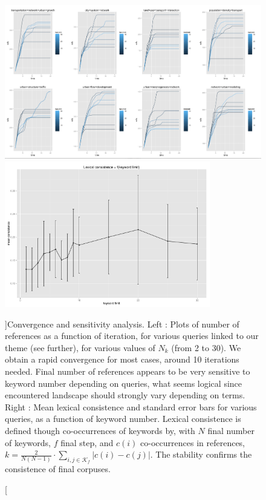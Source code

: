 \begin{figure}
\centering
\includegraphics[width=\textwidth]{Figures/QuantEpistemo/explo} %
\medskip
\includegraphics[width=0.8\textwidth]{Figures/QuantEpistemo/lexicalConsistence_MeanSd}
\caption[][]{Convergence and sensitivity analysis. Left : Plots of number of references as a function of iteration, for various queries linked to our theme (see further), for various values of $N_k$ (from 2 to 30). We obtain a rapid convergence for most cases, around 10 iterations needed. Final number of references appears to be very sensitive to keyword number depending on queries, what seems logical since encountered landscape should strongly vary depending on terms. Right : Mean lexical consistence and standard error bars for various queries, as a function of keyword number. Lexical consistence is defined though co-occurrences of keywords by, with $N$ final number of keywords, $f$ final step, and $c(i)$ co-occurrences in references, $k = \frac{2}{N(N-1)}\cdot \sum_{i,j \in \mathcal{K}_f}{\left| c(i) - c(j) \right|}$. The stability confirms the consistence of final corpuses.}{}
\label{fig:quantepistemo:sensitivity}
\end{figure}











